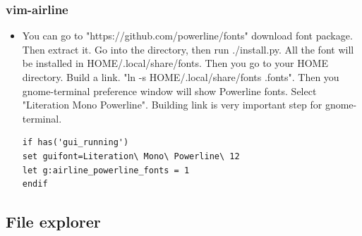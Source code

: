 \documentclass[a4paper,11pt,twoside]{book}
\begin{document}
\subsubsection{vim-airline} 
\begin{itemize}

\item You can go to "https://github.com/powerline/fonts" download font package. Then extract it. Go into the directory, then run ./install.py.  All the font will be installed in HOME/.local/share/fonts. Then you go to your HOME directory. Build a link. "ln -s HOME/.local/share/fonts .fonts". Then you gnome-terminal preference window will show Powerline fonts. Select "Literation Mono Powerline". Building link is very important step for gnome-terminal. 

\begin{verbatim}
if has('gui_running')
set guifont=Literation\ Mono\ Powerline\ 12   
let g:airline_powerline_fonts = 1
endif
\end{verbatim} 
\end{itemize}

\subsection{File explorer}
\end{document}
